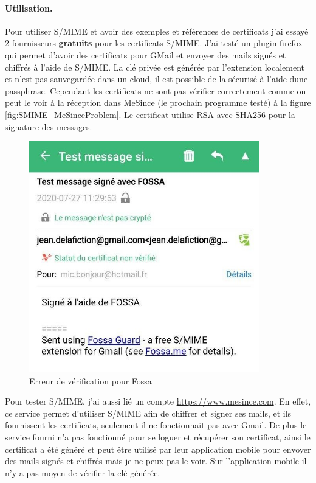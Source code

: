 \paragraph*{Utilisation.}
Pour utiliser S/MIME et avoir des exemples et références de certificats j'ai essayé 2 fournisseurs \textbf{gratuits} pour les certificats S/MIME.
J'ai testé un plugin firefox qui permet d'avoir des certificats pour GMail et envoyer des mails signés et chiffrés à l'aide de S/MIME. La clé privée est générée par l'extension localement et n'est pas sauvegardée dans un cloud, il est possible de la sécurisé à l'aide dune passphrase. Cependant les certificats ne sont pas vérifier correctement comme on peut le voir à la réception dans MeSince (le prochain programme testé) à la figure \ref{fig:SMIME_MeSinceProblem}. Le certificat utilise RSA avec SHA256 pour la signature des messages.
\begin{figure}[h!]
	\includegraphics[width=10cm]{images/SMIME_FossaProblem.jpg}
	\centering
	\caption{Erreur de vérification pour Fossa}
	\label{fig:SMIME_FossaProblem}
\end{figure}
Pour tester S/MIME, j'ai aussi lié un compte \url{https://www.mesince.com}. En effet, ce service permet d'utiliser S/MIME afin de chiffrer et signer ses mails, et ils fournissent les certificats, seulement il ne fonctionnait pas avec Gmail. De plus le service fourni n'a pas fonctionné pour se loguer et récupérer son certificat, ainsi le certificat a été généré et peut être utilisé par leur application mobile pour envoyer des mails signés et chiffrés mais je ne peux pas le voir. Sur l'application mobile il n'y a pas moyen de vérifier la clé générée.

